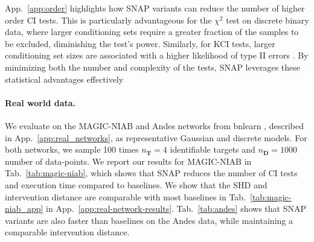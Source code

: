 App.~\ref{app:order} highlights how SNAP variants can reduce the number of higher order CI tests. This is particularly advantageous for the $\chi^2$ test on discrete binary data, where larger conditioning sets require a greater fraction of the samples to be excluded, diminishing the test’s power. Similarly, for KCI tests, larger conditioning set sizes are associated with a higher likelihood of type II errors \citep{zhang2011kernel}. By minimizing both the number and complexity of the tests, SNAP leverages these statistical advantages effectively

\paragraph{Real world data.}
We evaluate on the MAGIC-NIAB and Andes networks from bnlearn \citep{scutari2010bnlearn}, described in App.~\ref{app:real_networks}, as representative Gaussian and discrete models.
For both networks, we sample 100 times $n_{\mathbf{T}}=4$ identifiable targets and $n_{\mathbf{D}} = 1000$ number of data-points.
We report our results for MAGIC-NIAB in Tab.~\ref{tab:magic-niab}, which shows that SNAP reduces the number of CI tests and execution time compared to baselines. We show that the \ac{SHD} and intervention distance are comparable with most baselines in Tab.~\ref{tab:magic-niab_app} in App.~\ref{app:real-network-results}.  Tab.~\ref{tab:andes} shows that SNAP variants are also faster than baselines on the Andes data, while maintaining a comparable intervention distance.

